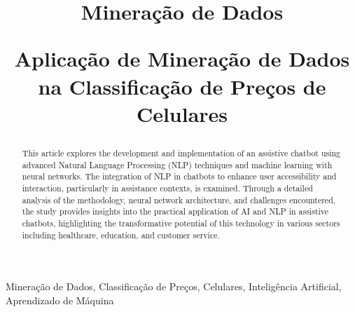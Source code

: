 \documentclass[conference]{IEEEtran}
\begin{document}
\title{Mineração de Dados 

Aplicação de Mineração de Dados na Classificação de Preços de Celulares\\
}

\author{
\and

}

\maketitle

\begin{abstract}
This article explores the development and implementation of an assistive chatbot using advanced Natural Language Processing (NLP) techniques 
and machine learning with neural networks. 
The integration of NLP in chatbots to enhance user accessibility and interaction, particularly in assistance contexts, is examined. 
Through a detailed analysis of the methodology, neural network architecture, and challenges encountered, 
the study provides insights into the practical application of AI and NLP in assistive chatbots, 
highlighting the transformative potential of this technology in various sectors including healthcare, education, and customer service.
\end{abstract}

\begin{IEEEkeywords}
Mineração de Dados, Classificação de Preços, Celulares, Inteligência Artificial, Aprendizado de Máquina
\end{IEEEkeywords}




\end{document}
